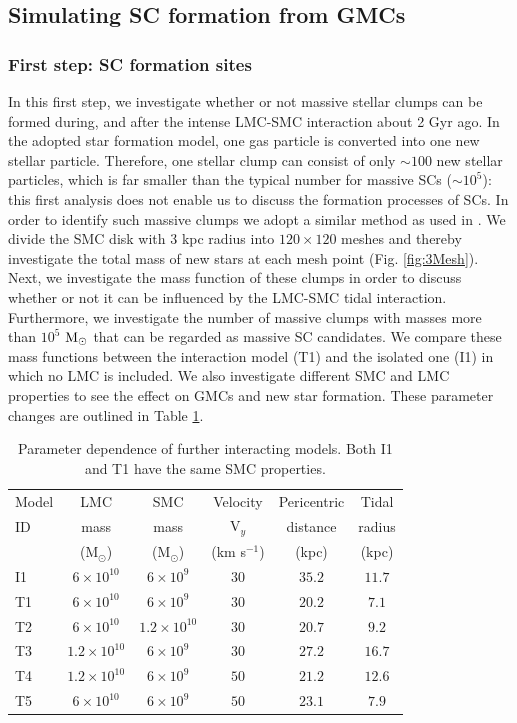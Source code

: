 \documentclass[fleqn,usenatbib]{mnras}
\begin{document}
\subsection{Simulating SC formation from GMCs}
\subsubsection{First step: SC formation sites}


In this first step, we investigate whether or not massive stellar clumps
can be formed during, and after the intense LMC-SMC interaction about 2 Gyr ago. In the adopted star formation model,
one gas particle is converted into one new stellar particle.
Therefore, one stellar clump
can consist of only ${\sim} 100$ new stellar particles, which is far
smaller than the typical number for massive SCs (${\sim} 10^5$): this first
analysis does not enable us to discuss the formation processes of SCs.
In order to identify such massive clumps we adopt a similar method as used in \cite{M7_McKenzie_Bekki_2021}. We divide the SMC disk with 3 kpc radius into $120 \times 120$ meshes and thereby investigate the total
mass of new stars at each mesh point (Fig. \ref{fig:3Mesh}). Next, we investigate the mass function of these clumps in order to discuss whether or not it can be influenced by the LMC-SMC tidal interaction. Furthermore, we 
investigate the number of massive clumps with masses more than 
$10^5$ ${\rm M}_{\odot}$
that can be regarded as massive SC candidates. 
We compare these mass functions between the interaction model (T1) and the isolated
one (I1) in which no LMC is included. We also investigate different SMC and LMC properties to see the effect on GMCs and new star formation. These parameter changes are outlined in Table \ref{table:1SMCmod}.

\begin{table}
\centering
 \caption{Parameter dependence of further interacting models. Both I1 and T1 have the same SMC properties.}
 \label{table:1SMCmod}
 \begin{tabular}{lccccc}
  \hline
  Model & LMC & SMC & Velocity & Pericentric & Tidal \\ 
                ID & mass & mass &V$_y$ & distance & radius\\
                &(M$_\odot$)&(M$_\odot$)&(km s$^{-1}$)&(kpc)&(kpc)\\
  \hline
  I1 & $6 \times 10^{10}$ & $6 \times 10^9$ & $30$ & $35.2$ & $11.7$\\ 
  T1 & $6 \times 10^{10}$ & $6 \times 10^9$ & $30$ & $20.2$ & $7.1$\\ 
  T2 & $6 \times 10^{10}$ & $1.2 \times 10^{10}$ & $30$ & $20.7$ & $9.2$\\
  T3 & $1.2 \times 10^{10}$ & $6 \times 10^9$ & $30$ & $27.2$ & $16.7$\\ 
  T4 & $1.2 \times 10^{10}$ & $6 \times 10^9$ & $50$ &$21.2$ & $12.6$\\ 
  T5 & $6 \times 10^{10}$ & $6 \times 10^9$ & $50$ &$23.1$ & $7.9$\\ \hline
 \end{tabular}
\end{table}
\end{document}
